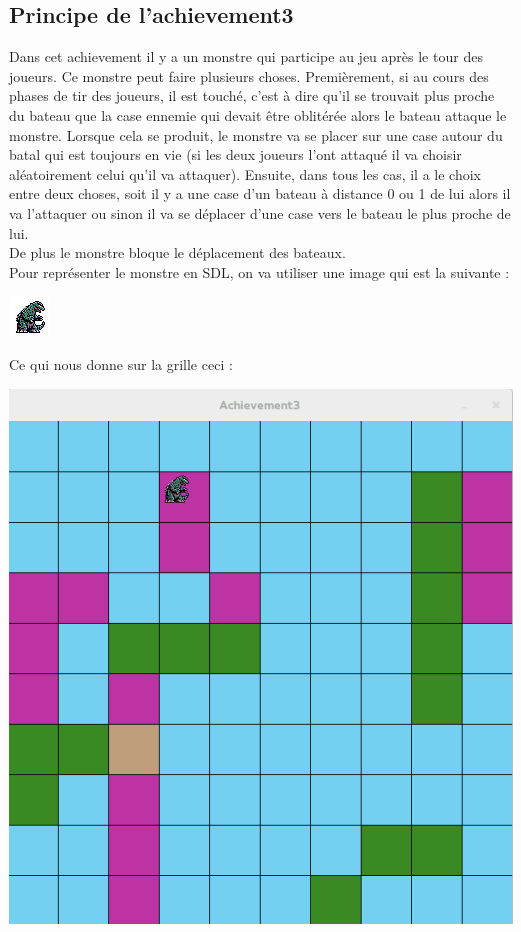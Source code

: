 \subsection{Principe de l’achievement3}
Dans cet achievement il y a un monstre qui participe au jeu après le tour des joueurs. Ce monstre peut faire plusieurs choses. Premièrement, si au cours des phases de tir des joueurs, il est touché, c'est à dire qu'il se trouvait plus proche du bateau que la case ennemie qui devait être oblitérée alors le bateau attaque le monstre. Lorsque cela se produit, le monstre va se placer sur une case autour du batal qui est toujours en vie (si les deux joueurs l'ont attaqué il va choisir aléatoirement celui qu'il va attaquer). Ensuite, dans tous les cas, il a le choix entre deux choses, soit il y a une case d'un bateau à distance 0 ou 1 de lui alors il va l'attaquer ou sinon il va se déplacer d'une case vers le bateau le plus proche de lui.\\
De plus le monstre bloque le déplacement des bateaux.\\
Pour représenter le monstre en SDL, on va utiliser une image qui est la suivante :\\
\begin{center}
  \includegraphics{./image/godzilla.png}
\end{center}
Ce qui nous donne sur la grille ceci : \\
\begin{center}
  \includegraphics[scale=0.5]{./image/Godzilla_SDL.png}
\end{center}
